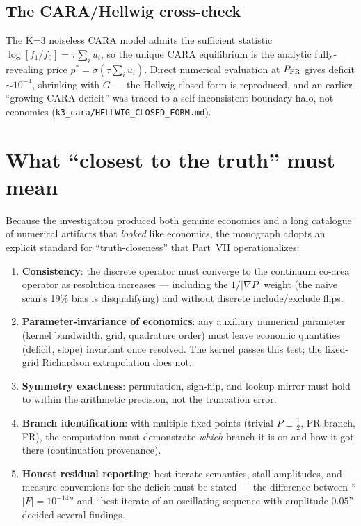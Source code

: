 \documentclass[11pt]{report}
\begin{document}
\section{The CARA/Hellwig cross-check}
The K=3 noiseless CARA model admits the sufficient statistic
$\log[f_1/f_0] = \tau \sum_i u_i$, so the unique CARA equilibrium is the
analytic fully-revealing price $p^* = \sigma(\tau \sum_i u_i)$. Direct
numerical evaluation at $P_{\rm FR}$ gives deficit $\sim 10^{-4}$,
shrinking with $G$ --- the Hellwig closed form is reproduced, and an
earlier ``growing CARA deficit'' was traced to a self-inconsistent
boundary halo, not economics
(\texttt{k3\_cara/HELLWIG\_CLOSED\_FORM.md}).

\chapter{What ``closest to the truth'' must mean}

Because the investigation produced both genuine economics and a long
catalogue of numerical artifacts that \emph{looked} like economics, the
monograph adopts an explicit standard for ``truth-closeness'' that
Part~VII operationalizes:

\begin{enumerate}\itemsep2pt
  \item \textbf{Consistency}: the discrete operator must converge to
        the continuum co-area operator as resolution increases ---
        including the $1/|\nabla P|$ weight (the naive scan's 19\% bias
        is disqualifying) and without discrete include/exclude flips.
  \item \textbf{Parameter-invariance of economics}: any auxiliary
        numerical parameter (kernel bandwidth, grid, quadrature order)
        must leave economic quantities (deficit, slope) invariant once
        resolved. The kernel passes this test; the fixed-grid
        Richardson extrapolation does not.
  \item \textbf{Symmetry exactness}: permutation, sign-flip, and lookup
        mirror must hold to within the arithmetic precision, not the
        truncation error.
  \item \textbf{Branch identification}: with multiple fixed points
        (trivial $P \equiv \tfrac12$, PR branch, FR), the computation
        must demonstrate \emph{which} branch it is on and how it got
        there (continuation provenance).
  \item \textbf{Honest residual reporting}: best-iterate semantics,
        stall amplitudes, and measure conventions for the deficit must
        be stated --- the difference between ``$|F| = 10^{-14}$'' and
        ``best iterate of an oscillating sequence with amplitude
        $0.05$'' decided several findings.
\end{enumerate}










\end{document}
